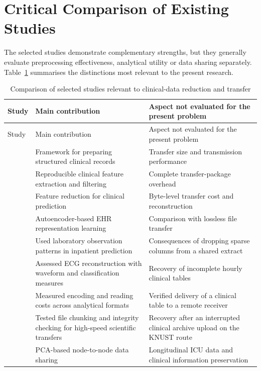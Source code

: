 \section{Critical Comparison of Existing Studies}\label{critical-comparison-of-existing-studies}

The selected studies demonstrate complementary strengths, but they
generally evaluate preprocessing effectiveness, analytical utility or
data sharing separately. Table~\ref{tab:ch2-comparison} summarises the distinctions most
relevant to the present research.

\begin{longtable}{@{}>{\raggedright\arraybackslash}p{}>{\raggedright\arraybackslash}p{}>{\raggedright\arraybackslash}p{}@{}}
	\caption{Comparison of selected studies relevant to clinical-data reduction and transfer}\label{tab:ch2-comparison}\\
	\toprule
	Study & Main contribution & Aspect not evaluated for the present problem \\
	\midrule
	\endfirsthead
	\toprule
	Study & Main contribution & Aspect not evaluated for the present problem \\
	\midrule
	\endhead
	\bottomrule
	\endfoot
	\citet{Ferrao2016} & Framework for preparing structured clinical records & Transfer size and transmission performance \\
	\citet{Tang2020} & Reproducible clinical feature extraction and filtering & Complete transfer-package overhead \\
	\citet{Hernandez2023} & Feature reduction for clinical prediction & Byte-level transfer cost and reconstruction \\
	\citet{Landi2020} & Autoencoder-based EHR representation learning & Comparison with lossless file transfer \\
	\citet{Sun2024} & Used laboratory observation patterns in inpatient prediction & Consequences of dropping sparse columns from a shared extract \\
    \citet{Guan2026} & Assessed ECG reconstruction with waveform and classification measures & Recovery of incomplete hourly clinical tables \\
    \citet{Liu2025} & Measured encoding and reading costs across analytical formats & Verified delivery of a clinical table to a remote receiver \\
    \citet{Zheng2024} & Tested file chunking and integrity checking for high-speed scientific transfers & Recovery after an interrupted clinical archive upload on the KNUST route \\
    \citet{LeeShinLee2025} & PCA-based node-to-node data sharing & Longitudinal ICU data and clinical information preservation \\
\end{longtable}


